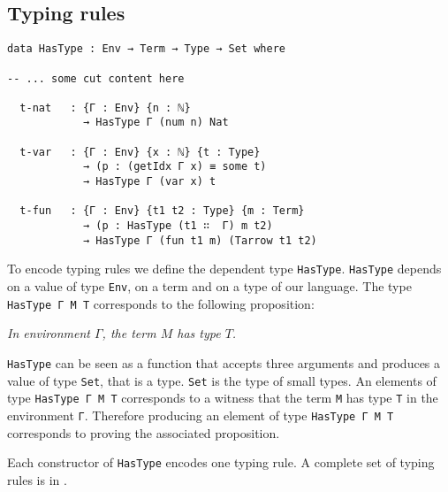 \documentclass{article}
\begin{document}
\subsection*{Typing rules}

\begin{verbatim}
data HasType : Env → Term → Type → Set where

-- ... some cut content here

  t-nat   : {Γ : Env} {n : ℕ}
            → HasType Γ (num n) Nat

  t-var   : {Γ : Env} {x : ℕ} {t : Type}
            → (p : (getIdx Γ x) ≡ some t)
            → HasType Γ (var x) t
            
  t-fun   : {Γ : Env} {t1 t2 : Type} {m : Term}
            → (p : HasType (t1 ∷  Γ) m t2)
            → HasType Γ (fun t1 m) (Tarrow t1 t2)
\end{verbatim}

To encode typing rules we define the dependent type \texttt{HasType}.
\texttt{HasType} depends on a value of type \texttt{Env}, on a term and on a type of our language.
The type \texttt{HasType Γ M T} corresponds to the following proposition:

\vspace{1em}
\textit{In environment $\Gamma$, the term $M$ has type $T$.}
\vspace{1em}

\texttt{HasType} can be seen as a function that accepts three arguments and produces a value of type \texttt{Set}, that is a type.
\texttt{Set} is the type of small types.
An elements of type \texttt{HasType Γ M T} corresponds to a witness that the term \texttt{M} has type \texttt{T} in the environment \texttt{Γ}.
Therefore producing an element of type \texttt{HasType Γ M T} corresponds to proving the associated proposition.

Each constructor of \texttt{HasType} encodes one typing rule.
A complete set of typing rules is in \cite[p.\ 15]{crafa}.
\end{document}
